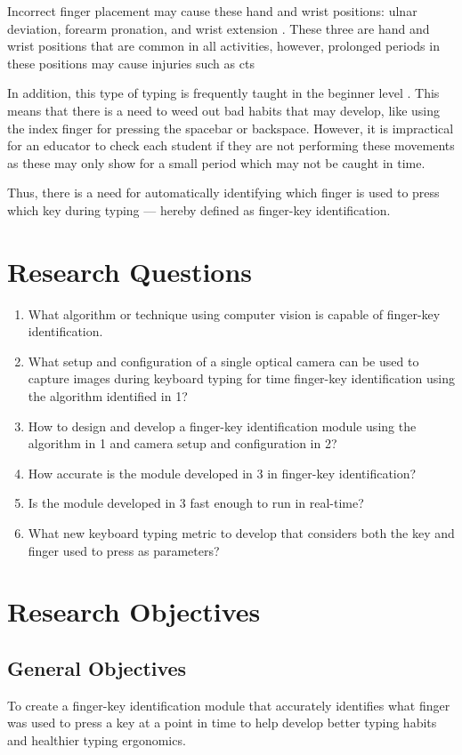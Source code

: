 \documentclass{report}
\begin{document}
Incorrect finger placement may cause these hand and wrist positions: ulnar
deviation, forearm pronation, and wrist extension \parencite{serina1999}. These
three are hand and wrist positions that are common in all activities, however,
prolonged periods in these positions may cause injuries such as \ac{cts}
\parencite{toosi2015}

In addition, this type of typing is frequently taught in the beginner level
\parencite{donica2018}. This means that there is a need to weed out bad habits
that may develop, like using the index finger for pressing the spacebar or
backspace. However, it is impractical for an educator to check each student if
they are not performing these movements as these may only show for a small
period which may not be caught in time.

Thus, there is a need for automatically identifying which finger is used to
press which key during typing --- hereby defined as finger-key identification.

\section{Research Questions}
\begin{enumerate}
	\item What algorithm or technique using computer vision is capable of
	      finger-key identification.
	\item What setup and configuration of a single optical camera can be used to
	      capture images during keyboard typing for time finger-key identification
	      using the algorithm identified in 1?
	\item How to design and develop a finger-key identification module using
	      the algorithm in 1 and camera setup and configuration in 2?
	\item How accurate is the module developed in 3 in finger-key identification?
	\item Is the module developed in 3 fast enough to run in real-time?
	\item What new keyboard typing metric to develop that considers both the key and
	      finger used to press as parameters?
\end{enumerate}

\section{Research Objectives}

\subsection{General Objectives}
To create a finger-key identification module that accurately identifies what
finger was used to press a key at a point in time to help develop better typing
habits and healthier typing ergonomics.
\end{document}
